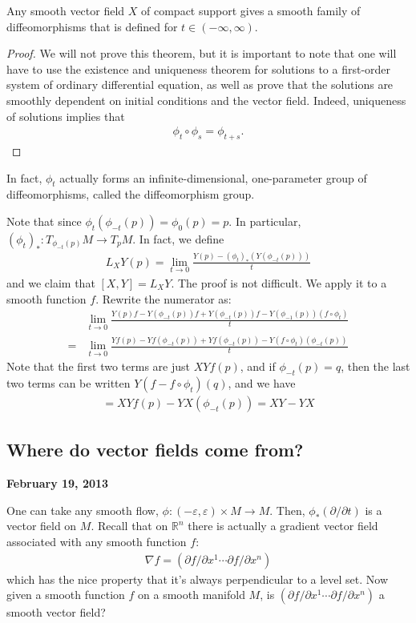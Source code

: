 \documentclass{../mathnotes}
\begin{document}
\begin{thm}
    Any smooth vector field $X$ of compact support gives a smooth family of diffeomorphisms that is defined for $t\in\left( -\infty,\infty \right)$.
\end{thm}
\begin{proof}
    We will not prove this theorem, but it is important to note that one will have to use the existence and uniqueness theorem
    for solutions to a first-order system of ordinary differential equation, as well as prove that the solutions are smoothly
    dependent on initial conditions and the vector field. Indeed, uniqueness of solutions implies that
    \begin{align*}
        \phi_t\circ\phi_s=\phi_{t+s}.
    \end{align*}
\end{proof}
In fact, $\phi_t$ actually forms an infinite-dimensional, one-parameter group of diffeomorphisms, called the diffeomorphism group.

Note that since $\phi_t(\phi_{-t}(p))=\phi_0(p)=p$. In particular, $(\phi_t)_*:T_{\phi_{-t}(p)}M\to T_pM$. In fact, we define
\begin{align*}
    L_XY(p)=\lim_{t\to 0}\frac{Y(p)-(\phi_t)_*(Y(\phi_{-t}(p)))}{t}
\end{align*}
and we claim that $[X,Y]=L_XY$. The proof is not difficult. We apply it to a smooth function $f$. Rewrite the numerator as:
\begin{align*}
    &\lim_{t\to0}\frac{Y(p)f-Y(\phi_{-t}(p))f+Y(\phi_{-t}(p))f-Y(\phi_{-1}(p))(f\circ\phi_t)}{t}\\
    =&\lim_{t\to 0}\frac{Yf(p)-Yf(\phi_{-t}(p))+Yf(\phi_{-t}(p))-Y(f\circ\phi_t)(\phi_{-t}(p))}{t}
\end{align*}
Note that the first two terms are just $XYf(p)$, and if $\phi_{-t}(p)=q$, then the last two terms can be written $Y(f-f\circ\phi_t)(q)$,
and we have
\begin{align*}
    =XYf(p)-YX(\phi_{-t}(p))=XY-YX
\end{align*}

\subsection*{Where do vector fields come from?}

\textbf{February 19, 2013}

One can take any smooth flow, $\phi:(-\varepsilon,\varepsilon)\times M\to M$. Then, $\phi_*(\partial/\partial t)$ is a vector field
on $M$. Recall that on $\mathbb{R}^n$ there is actually a gradient vector field associated with any smooth function $f$:
\begin{align*}
    \nabla f = \left( \partial f/\partial x^1 \cdots \partial f/\partial x^n \right)
\end{align*}
which has the nice property that it's always perpendicular to a level set. Now given a smooth function $f$ on a smooth manifold $M$,
is $(\partial f/\partial x^1\cdots\partial f/\partial x^n)$ a smooth vector field?
\end{document}
